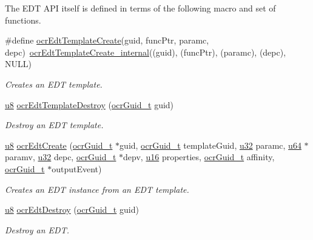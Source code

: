 The EDT API itself is defined in terms of the following macro and set of functions.
\begin{DoxyCompactItemize}
\item
\#define \hyperlink{group__OCREDT_ga9649098ffad669c1c820cd821792d67a}
{ocr\-Edt\-Template\-Create}(guid, func\-Ptr, paramc, depc)~\hyperlink{group__OCREDT_gaa481a8e8f1a2af9aba623cb01b01bc1b}
{ocr\-Edt\-Template\-Create\-\_\-internal}((guid), (func\-Ptr), (paramc), (depc), N\-U\-L\-L)
\begin{DoxyCompactList}\small\item\em Creates an E\-D\-T template. \end{DoxyCompactList}

\item
\hyperlink{group__OCRTypesGeneral_ga92c50087ca0e64fa93fc59402c55f8ca}{u8} \hyperlink{group__OCREDT_gace7063cfee522df47c64bf5013385c10}
{ocr\-Edt\-Template\-Destroy} (\hyperlink{group__OCRTypesGeneral_gacde3883d1ce245c051133c2c3aa82fc8}{ocr\-Guid\-\_\-t} guid)
\begin{DoxyCompactList}\small\item\em Destroy an E\-D\-T template. \end{DoxyCompactList}

\item
\hyperlink{group__OCRTypesGeneral_ga92c50087ca0e64fa93fc59402c55f8ca}{u8} \hyperlink{group__OCREDT_gafa2443b31c38b4b7f9f59713abe12ecc}
{ocr\-Edt\-Create} (\hyperlink{group__OCRTypesGeneral_gacde3883d1ce245c051133c2c3aa82fc8}{ocr\-Guid\-\_\-t} $\ast$guid, \hyperlink{group__OCRTypesGeneral_gacde3883d1ce245c051133c2c3aa82fc8}{ocr\-Guid\-\_\-t} template\-Guid, \hyperlink{group__OCRTypesGeneral_gafaa62991928fb9fb18ff0db62a040aba}{u32} paramc, \hyperlink{group__OCRTypesGeneral_ga3f7e2bcbb0b4c338f3c4f6c937cd4234}{u64} $\ast$paramv, \hyperlink{group__OCRTypesGeneral_gafaa62991928fb9fb18ff0db62a040aba}{u32} depc, \hyperlink{group__OCRTypesGeneral_gacde3883d1ce245c051133c2c3aa82fc8}{ocr\-Guid\-\_\-t} $\ast$depv, \hyperlink{group__OCRTypesGeneral_gace9d960e74685e2cd84b36132dbbf8aa}{u16} properties, \hyperlink{group__OCRTypesGeneral_gacde3883d1ce245c051133c2c3aa82fc8}{ocr\-Guid\-\_\-t} affinity, \hyperlink{group__OCRTypesGeneral_gacde3883d1ce245c051133c2c3aa82fc8}{ocr\-Guid\-\_\-t} $\ast$output\-Event)
\begin{DoxyCompactList}\small\item\em Creates an E\-D\-T instance from an E\-D\-T template. \end{DoxyCompactList}

\item
\hyperlink{group__OCRTypesGeneral_ga92c50087ca0e64fa93fc59402c55f8ca}{u8} \hyperlink{group__OCREDT_gae258a29af116794a73099e9c6d9232f8}
{ocr\-Edt\-Destroy} (\hyperlink{group__OCRTypesGeneral_gacde3883d1ce245c051133c2c3aa82fc8}{ocr\-Guid\-\_\-t} guid)
\begin{DoxyCompactList}\small\item\em Destroy an E\-D\-T. \end{DoxyCompactList}

\end{DoxyCompactItemize}


